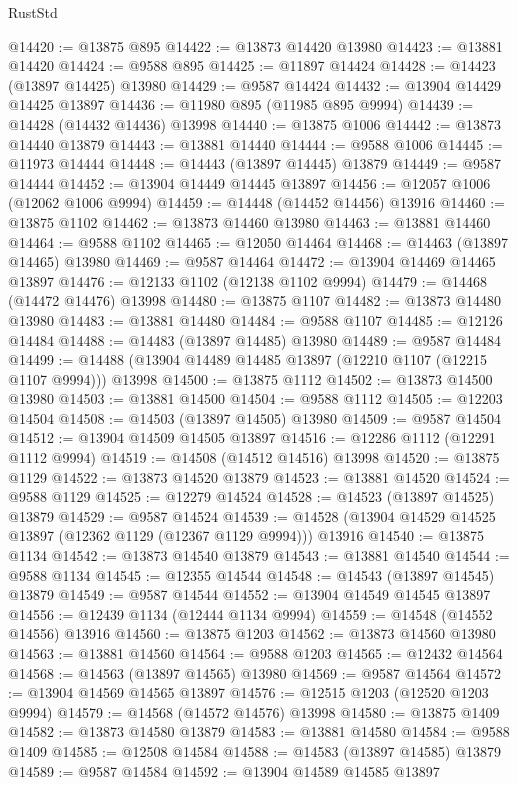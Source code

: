 \begin{lexlean}{RustStd}
\begin{coremodule}
@14420 := @13875 @895
@14422 := @13873 @14420 @13980
@14423 := @13881 @14420
@14424 := @9588 @895
@14425 := @11897 @14424
@14428 := @14423 (@13897 @14425) @13980
@14429 := @9587 @14424
@14432 := @13904 @14429 @14425 @13897
@14436 := @11980 @895 (@11985 @895 @9994)
@14439 := @14428 (@14432 @14436) @13998
@14440 := @13875 @1006
@14442 := @13873 @14440 @13879
@14443 := @13881 @14440
@14444 := @9588 @1006
@14445 := @11973 @14444
@14448 := @14443 (@13897 @14445) @13879
@14449 := @9587 @14444
@14452 := @13904 @14449 @14445 @13897
@14456 := @12057 @1006 (@12062 @1006 @9994)
@14459 := @14448 (@14452 @14456) @13916
@14460 := @13875 @1102
@14462 := @13873 @14460 @13980
@14463 := @13881 @14460
@14464 := @9588 @1102
@14465 := @12050 @14464
@14468 := @14463 (@13897 @14465) @13980
@14469 := @9587 @14464
@14472 := @13904 @14469 @14465 @13897
@14476 := @12133 @1102 (@12138 @1102 @9994)
@14479 := @14468 (@14472 @14476) @13998
@14480 := @13875 @1107
@14482 := @13873 @14480 @13980
@14483 := @13881 @14480
@14484 := @9588 @1107
@14485 := @12126 @14484
@14488 := @14483 (@13897 @14485) @13980
@14489 := @9587 @14484
@14499 := @14488 (@13904 @14489 @14485 @13897 (@12210 @1107 (@12215 @1107 @9994))) @13998
@14500 := @13875 @1112
@14502 := @13873 @14500 @13980
@14503 := @13881 @14500
@14504 := @9588 @1112
@14505 := @12203 @14504
@14508 := @14503 (@13897 @14505) @13980
@14509 := @9587 @14504
@14512 := @13904 @14509 @14505 @13897
@14516 := @12286 @1112 (@12291 @1112 @9994)
@14519 := @14508 (@14512 @14516) @13998
@14520 := @13875 @1129
@14522 := @13873 @14520 @13879
@14523 := @13881 @14520
@14524 := @9588 @1129
@14525 := @12279 @14524
@14528 := @14523 (@13897 @14525) @13879
@14529 := @9587 @14524
@14539 := @14528 (@13904 @14529 @14525 @13897 (@12362 @1129 (@12367 @1129 @9994))) @13916
@14540 := @13875 @1134
@14542 := @13873 @14540 @13879
@14543 := @13881 @14540
@14544 := @9588 @1134
@14545 := @12355 @14544
@14548 := @14543 (@13897 @14545) @13879
@14549 := @9587 @14544
@14552 := @13904 @14549 @14545 @13897
@14556 := @12439 @1134 (@12444 @1134 @9994)
@14559 := @14548 (@14552 @14556) @13916
@14560 := @13875 @1203
@14562 := @13873 @14560 @13980
@14563 := @13881 @14560
@14564 := @9588 @1203
@14565 := @12432 @14564
@14568 := @14563 (@13897 @14565) @13980
@14569 := @9587 @14564
@14572 := @13904 @14569 @14565 @13897
@14576 := @12515 @1203 (@12520 @1203 @9994)
@14579 := @14568 (@14572 @14576) @13998
@14580 := @13875 @1409
@14582 := @13873 @14580 @13879
@14583 := @13881 @14580
@14584 := @9588 @1409
@14585 := @12508 @14584
@14588 := @14583 (@13897 @14585) @13879
@14589 := @9587 @14584
@14592 := @13904 @14589 @14585 @13897

\end{coremodule}
\end{lexlean}
